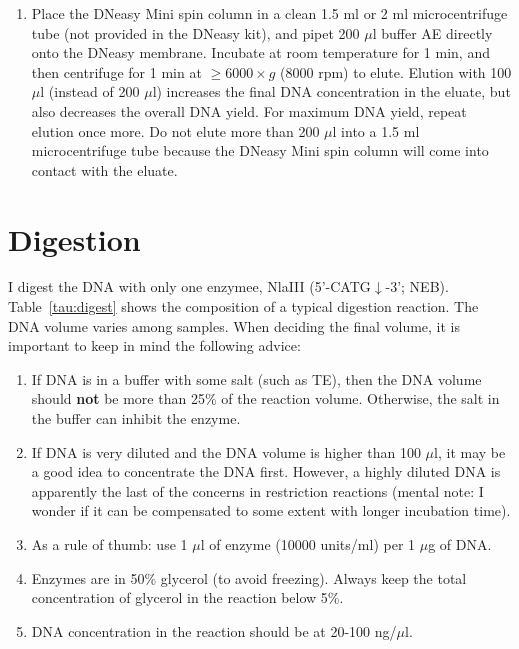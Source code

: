 \documentclass[a4paper,12pt]{article}
\begin{document}
\begin{enumerate}
\item Place the DNeasy Mini spin column in a clean 1.5 ml or 2 ml microcentrifuge tube (not provided in the DNeasy kit), and pipet 200 $\mu$l buffer AE directly onto the DNeasy membrane. Incubate at room temperature for 1 min, and then centrifuge for 1 min at $\geq6000 \times g$ (8000 rpm) to elute. Elution with 100 $\mu$l (instead of 200 $\mu$l) increases the final DNA concentration in the eluate, but also decreases the overall DNA yield. For maximum DNA yield, repeat elution once more. Do not elute more than 200 $\mu$l into a 1.5 ml microcentrifuge tube because the DNeasy Mini spin column will come into contact with the eluate.
\end{enumerate}

\section{Digestion}
I digest the DNA with only one enzymee, NlaIII (5'-CATG$\downarrow$-3'; NEB). Table~\ref{tau:digest} shows the composition of a typical digestion reaction. The DNA volume varies among samples. When deciding the final volume, it is important to keep in mind the following advice:
\begin{enumerate}
   \item If DNA is in a buffer with some salt (such as TE), then the DNA volume should \textbf{not} be more than 25\% of the reaction volume. Otherwise, the salt in the buffer can inhibit the enzyme.
   \item If DNA is very diluted and the DNA volume is higher than 100 $\mu$l, it may be a good idea to concentrate the DNA first. However, a highly diluted DNA is apparently the last of the concerns in restriction reactions (mental note: I wonder if it can be compensated to some extent with longer incubation time).
   \item As a rule of thumb: use 1 $\mu$l of enzyme (10000 units/ml) per 1 $\mu$g of DNA.
   \item Enzymes are in 50\% glycerol (to avoid freezing). Always keep the total concentration of glycerol in the reaction below 5\%.
   \item DNA concentration in the reaction should be at 20-100 ng/$\mu$l.
\end{enumerate}
\end{document}
